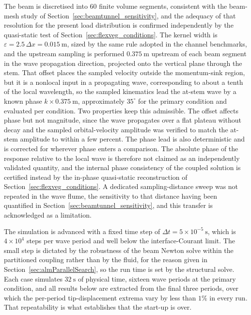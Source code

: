 \noindent
The beam is discretised into $60$ finite volume segments, consistent with the beam-mesh study of Section~\ref{sec:beamtunnel_sensitivity}, and the adequacy of that resolution for the present load distribution is confirmed independently by the quasi-static test of Section~\ref{sec:flexveg_conditions}. The kernel width is $\varepsilon = 2.5\,\Delta x = 0.015~\mathrm{m}$, sized by the same rule adopted in the channel benchmarks, and the upstream sampling is performed $0.375~\mathrm{m}$ upstream of each beam segment in the wave propagation direction, projected onto the vertical plane through the stem. That offset places the sampled velocity outside the momentum-sink region, but it is a nonlocal input in a propagating wave, corresponding to about a tenth of the local wavelength, so the sampled kinematics lead the at-stem wave by a known phase $k \times 0.375~\mathrm{m}$, approximately $35^{\circ}$ for the primary condition and evaluated per condition. Two properties keep this admissible. The offset affects phase but not magnitude, since the wave propagates over a flat plateau without decay and the sampled orbital-velocity amplitude was verified to match the at-stem amplitude to within a few percent. The phase lead is also deterministic and is corrected for wherever phase enters a comparison. The absolute phase of the response relative to the local wave is therefore not claimed as an independently validated quantity, and the internal phase consistency of the coupled solution is certified instead by the in-phase quasi-static reconstruction of Section~\ref{sec:flexveg_conditions}. A dedicated sampling-distance sweep was not repeated in the wave flume, the sensitivity to that distance having been quantified in Section~\ref{sec:beamtunnel_sensitivity}, and this transfer is acknowledged as a limitation.

\noindent
The simulation is advanced with a fixed time step of $\Delta t = 5\times10^{-5}~\mathrm{s}$, which is $4\times10^{4}$ steps per wave period and well below the interface-Courant limit. The small step is dictated by the robustness of the beam Newton solve within the partitioned coupling rather than by the fluid, for the reason given in Section~\ref{sec:almParallelSearch}, so the run time is set by the structural solve. Each case simulates $32~\mathrm{s}$ of physical time, sixteen wave periods at the primary condition, and all results below are extracted from the final three periods, over which the per-period tip-displacement extrema vary by less than $1\%$ in every run. That repeatability is what establishes that the start-up is over.

